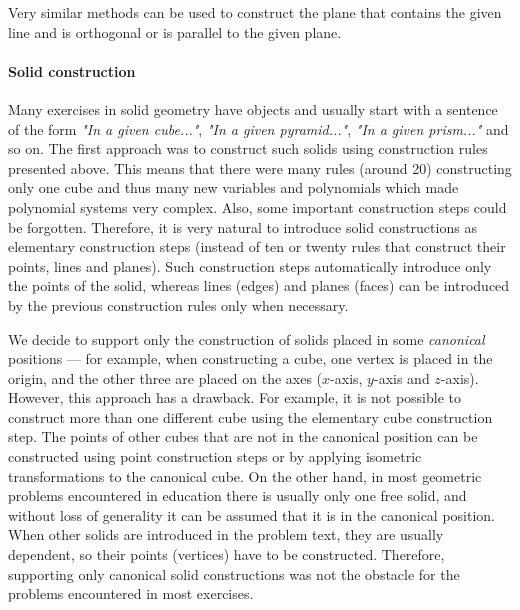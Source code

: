\documentclass{aicom2e}
\begin{document}
Very similar methods can be used to construct the plane that contains
the given line and is orthogonal or is parallel to the given plane.

\paragraph{Solid construction}
\label{objectconstruction}

Many exercises in solid geometry have objects and usually start with a
sentence of the form {\em "In a given cube..."}, {\em "In a given
  pyramid..."}, {\em "In a given prism..."} and so on. The first
approach was to construct such solids using construction rules
presented above. This means that there were many rules (around 20)
constructing only one cube and thus many new variables and polynomials
which made polynomial systems very complex. Also, some important
construction steps could be forgotten. Therefore, it is very natural
to introduce solid constructions as elementary construction steps
(instead of ten or twenty rules that construct their points, lines and
planes). Such construction steps automatically introduce only the
points of the solid, whereas lines (edges) and planes (faces) can be
introduced by the previous construction rules only when necessary.


We decide to support only the construction of solids placed in some
{\em canonical} positions --- for example, when constructing a cube,
one vertex is placed in the origin, and the other three are placed on
the axes ($x$-axis, $y$-axis and $z$-axis). However, this approach has
a drawback. For example, it is not possible to construct more than one
different cube using the elementary cube construction step. The points
of other cubes that are not in the canonical position can be
constructed using point construction steps or by applying isometric
transformations to the canonical cube. On the other hand, in most
geometric problems encountered in education there is usually only one
free solid, and without loss of generality it can be assumed that it
is in the canonical position. When other solids are introduced in the
problem text, they are usually dependent, so their points (vertices)
have to be constructed. Therefore, supporting only canonical solid
constructions was not the obstacle for the problems encountered in
most exercises.
\end{document}
